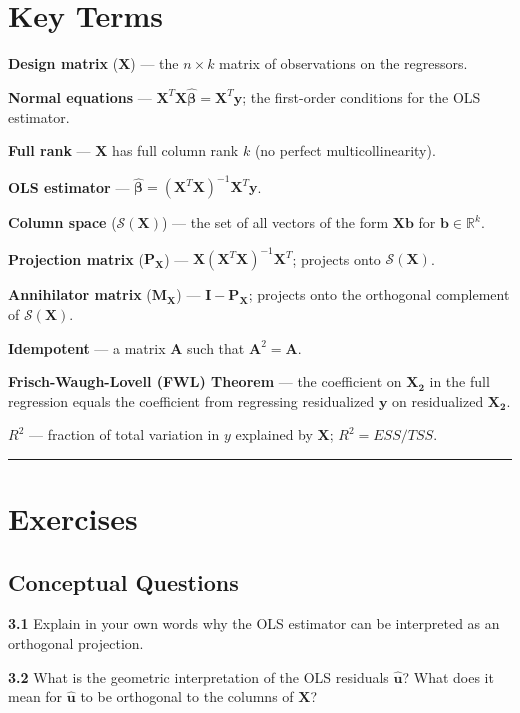 \section{Key Terms}

\textbf{Design matrix} ($\mathbf{X}$) --- the $n \times k$ matrix of observations on the regressors.

\textbf{Normal equations} --- $\mathbf{X}^T\mathbf{X}\hat{\boldsymbol{\beta}} = \mathbf{X}^T\mathbf{y}$; the first-order conditions for the OLS estimator.

\textbf{Full rank} --- $\mathbf{X}$ has full column rank $k$ (no perfect multicollinearity).

\textbf{OLS estimator} --- $\hat{\boldsymbol{\beta}} = (\mathbf{X}^T\mathbf{X})^{-1}\mathbf{X}^T\mathbf{y}$.

\textbf{Column space} ($\mathcal{S}(\mathbf{X})$) --- the set of all vectors of the form $\mathbf{X}\mathbf{b}$ for $\mathbf{b} \in \mathbb{R}^k$.

\textbf{Projection matrix} ($\mathbf{P_X}$) --- $\mathbf{X}(\mathbf{X}^T\mathbf{X})^{-1}\mathbf{X}^T$; projects onto $\mathcal{S}(\mathbf{X})$.

\textbf{Annihilator matrix} ($\mathbf{M_X}$) --- $\mathbf{I} - \mathbf{P_X}$; projects onto the orthogonal complement of $\mathcal{S}(\mathbf{X})$.

\textbf{Idempotent} --- a matrix $\mathbf{A}$ such that $\mathbf{A}^2 = \mathbf{A}$.

\textbf{Frisch-Waugh-Lovell (FWL) Theorem} --- the coefficient on $\mathbf{X_2}$ in the full regression equals the coefficient from regressing residualized $\mathbf{y}$ on residualized $\mathbf{X_2}$.

\textbf{$R^2$} --- fraction of total variation in $y$ explained by $\mathbf{X}$; $R^2 = ESS/TSS$.

\medskip\hrule\medskip

\section{Exercises}

\subsection{Conceptual Questions}

\textbf{3.1} Explain in your own words why the OLS estimator can be interpreted as an orthogonal projection.

\textbf{3.2} What is the geometric interpretation of the OLS residuals $\hat{\mathbf{u}}$? What does it mean for $\hat{\mathbf{u}}$ to be orthogonal to the columns of $\mathbf{X}$?


